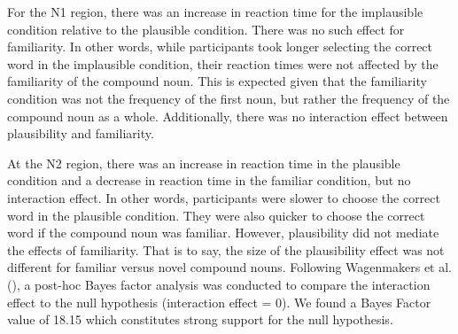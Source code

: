 \documentclass[
  12pt,
  letterpaper,
]{scrreprt}
\begin{document}
For the N1 region, there was an increase in reaction time for the
implausible condition relative to the plausible condition. There was no
such effect for familiarity. In other words, while participants took
longer selecting the correct word in the implausible condition, their
reaction times were not affected by the familiarity of the compound
noun. This is expected given that the familiarity condition was not the
frequency of the first noun, but rather the frequency of the compound
noun as a whole. Additionally, there was no interaction effect between
plausibility and familiarity.

At the N2 region, there was an increase in reaction time in the
plausible condition and a decrease in reaction time in the familiar
condition, but no interaction effect. In other words, participants were
slower to choose the correct word in the plausible condition. They were
also quicker to choose the correct word if the compound noun was
familiar. However, plausibility did not mediate the effects of
familiarity. That is to say, the size of the plausibility effect was not
different for familiar versus novel compound nouns. Following
Wagenmakers et al.
(), a
post-hoc Bayes factor analysis was conducted to compare the interaction
effect to the null hypothesis (interaction effect = 0). We found a Bayes
Factor value of 18.15 which constitutes strong support for the null
hypothesis.

\begin{table}

\caption{\label{tbl-N1Staub}Model results examining the effect of
plausibility and frequency for the N1 region.}


\end{table}%
\end{document}
